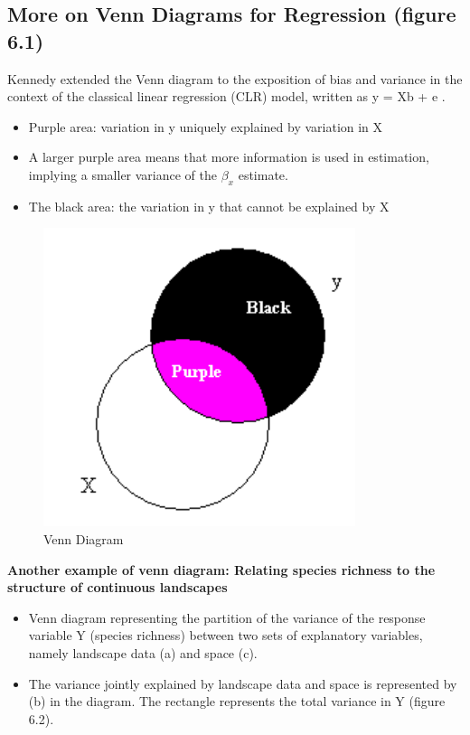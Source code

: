 \documentclass[
]{report}
\providecommand{\tightlist}{%
  \setlength{\itemsep}{0pt}\setlength{\parskip}{0pt}}
\begin{document}
\hypertarget{more-on-venn-diagrams-for-regression-figure-6.1}{%
\subsection{More on Venn Diagrams for Regression (figure 6.1)}\label{more-on-venn-diagrams-for-regression-figure-6.1}}

Kennedy \citep{kennedy} extended the Venn diagram to the exposition of bias and variance in the context of the classical linear regression (CLR) model, written as y = Xb + e .

\begin{itemize}
\tightlist
\item
  Purple area: variation in y uniquely explained by variation in X
\item
  A larger purple area means that more information is used in estimation, implying a smaller variance of the \(\beta_x\) estimate.
\item
  The black area: the variation in y that cannot be explained by X
\end{itemize}

\begin{figure}
    \centering
    \includegraphics[width= 250 pt]{vennken.PNG}
    \caption{Venn Diagram}
\end{figure}

\textbf{Another example of venn diagram: Relating species richness to the structure of continuous landscapes}

\begin{itemize}
\tightlist
\item
  Venn diagram representing the partition of the variance of the response variable Y (species richness) between two sets of explanatory variables, namely landscape data (a) and space (c).
\item
  The variance jointly explained by landscape data and space is represented by (b) in the diagram. The rectangle represents the total variance in Y (figure 6.2).
\end{itemize}
\end{document}

